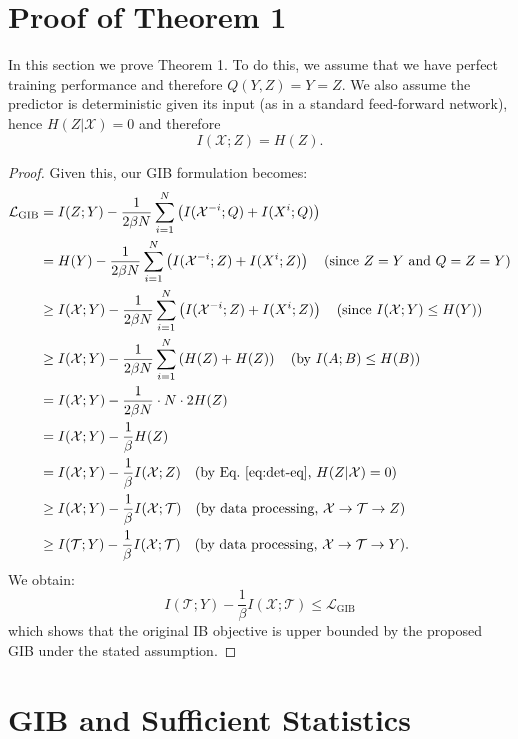 \documentclass{article}
\theoremstyle{definition}
\theoremstyle{remark}
\begin{document}
\section{Proof of Theorem 1}
\label{app:pot1}
In this section we prove Theorem 1. To do this, we assume that we have perfect training performance and therefore $Q(Y,Z) = Y = Z$. We also assume the predictor is deterministic given its input (as in a standard feed-forward network), hence $H(Z|\mathcal{X})=0$ and therefore
\begin{equation}
I(\mathcal{X};Z)=H(Z).
\label{eq:det-eq}
\end{equation}
%
\begin{proof}
Given this, our GIB formulation becomes:
\begin{align}
\mathcal{L}_{\text{GIB}} &= I(Z;Y) - \frac{1}{2\beta N}\sum_{i=1}^{N} \left(I(\mathcal{X}^{-i}; Q) + I(X^i; Q)\right) \\
&= H(Y) - \frac{1}{2\beta N}\sum_{i=1}^{N} \left(I(\mathcal{X}^{-i}; Z) + I(X^i; Z)\right) \quad \text{(since $Z=Y$ and $Q=Z=Y$)} \\
&\geq I(\mathcal{X}; Y) - \frac{1}{2\beta N}\sum_{i=1}^{N} \left(I(\mathcal{X}^{-i}; Z) + I(X^i; Z)\right) \quad \text{(since $I(\mathcal{X};Y) \le H(Y)$)} \\
&\geq I(\mathcal{X}; Y) - \frac{1}{2\beta N}\sum_{i=1}^{N} \left(H(Z) + H(Z)\right) \quad \text{(by $I(A;B)\le H(B)$)} \\
&= I(\mathcal{X}; Y) - \frac{1}{2\beta N} \cdot N \cdot 2H(Z) \\
&= I(\mathcal{X}; Y) - \frac{1}{\beta} H(Z) \\
&= I(\mathcal{X}; Y) - \frac{1}{\beta} I(\mathcal{X}; Z) \quad \text{(by Eq.~\ref{eq:det-eq}, $H(Z|\mathcal{X})=0$)} \\
&\geq I(\mathcal{X}; Y) - \frac{1}{\beta} I(\mathcal{X}; \mathcal{T}) \quad \text{(by data processing, $\mathcal{X}\to\mathcal{T}\to Z$)} \\
&\geq I(\mathcal{T}; Y) - \frac{1}{\beta} I(\mathcal{X}; \mathcal{T}) \quad \text{(by data processing, $\mathcal{X}\to\mathcal{T}\to Y$).}
\end{align}
%
We obtain:
$$I(\mathcal{T}; Y) - \frac{1}{\beta} I(\mathcal{X}; \mathcal{T}) \leq \mathcal{L}_{\text{GIB}}$$
%
which shows that the original IB objective is upper bounded by the proposed GIB under the stated assumption.
\end{proof}
%
\section{GIB and Sufficient Statistics}
\label{app:suf_stat}
\end{document}
